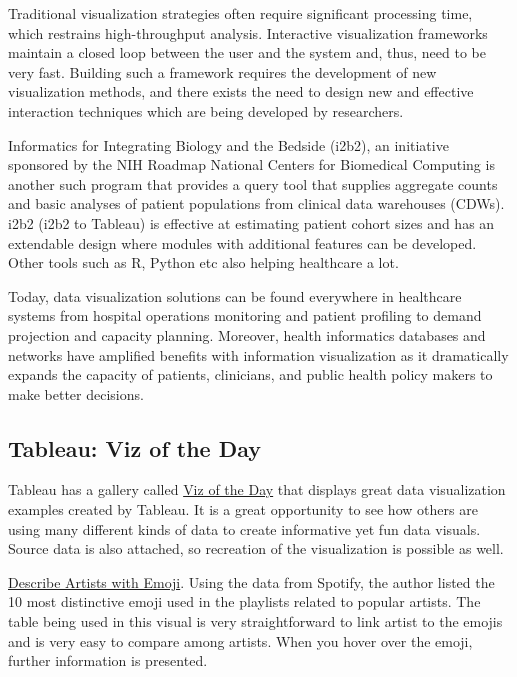 \documentclass[]{book}
\theoremstyle{definition}
\theoremstyle{definition}
\theoremstyle{definition}
\theoremstyle{remark}
\begin{document}
Traditional visualization strategies often require significant
processing time, which restrains high-throughput analysis. Interactive
visualization frameworks maintain a closed loop between the user and the
system and, thus, need to be very fast. Building such a framework
requires the development of new visualization methods, and there exists
the need to design new and effective interaction techniques which are
being developed by researchers.

Informatics for Integrating Biology and the Bedside (i2b2), an
initiative sponsored by the NIH Roadmap National Centers for Biomedical
Computing is another such program that provides a query tool that
supplies aggregate counts and basic analyses of patient populations from
clinical data warehouses (CDWs). i2b2 (i2b2 to Tableau) is effective at
estimating patient cohort sizes and has an extendable design where
modules with additional features can be developed. Other tools such as
R, Python etc also helping healthcare a lot.

Today, data visualization solutions can be found everywhere in
healthcare systems from hospital operations monitoring and patient
profiling to demand projection and capacity planning. Moreover, health
informatics databases and networks have amplified benefits with
information visualization as it dramatically expands the capacity of
patients, clinicians, and public health policy makers to make better
decisions.

\subsection{Tableau: Viz of the Day}\label{tableau-viz-of-the-day}

Tableau has a gallery called
\href{https://public.tableau.com/en-us/s/gallery}{Viz of the Day} that
displays great data visualization examples created by Tableau. It is a
great opportunity to see how others are using many different kinds of
data to create informative yet fun data visuals. Source data is also
attached, so recreation of the visualization is possible as well.

\href{https://public.tableau.com/en-us/s/gallery/what-emoji-say-about-music?gallery=featured}{Describe
Artists with Emoji}. Using the data from Spotify, the author listed the
10 most distinctive emoji used in the playlists related to popular
artists. The table being used in this visual is very straightforward to
link artist to the emojis and is very easy to compare among artists.
When you hover over the emoji, further information is presented.
\end{document}
